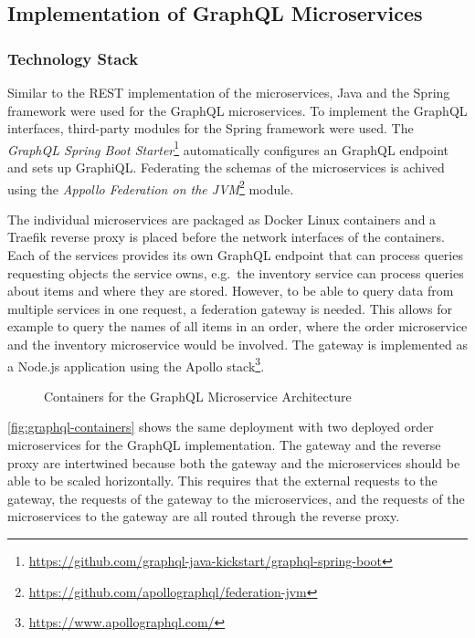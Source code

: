 \subsection{Implementation of GraphQL Microservices}

\subsubsection{Technology Stack}

Similar to the \ac{REST} implementation of the microservices, Java and the Spring framework were used for the GraphQL microservices.
To implement the GraphQL interfaces, third-party modules for the Spring framework were used.
The \textit{GraphQL Spring Boot Starter}\footnote{\url{https://github.com/graphql-java-kickstart/graphql-spring-boot}} automatically configures an GraphQL endpoint and sets up GraphiQL.%
Federating the schemas of the microservices is achived using the \textit{Appollo Federation on the \acs{JVM}}\footnote{\url{https://github.com/apollographql/federation-jvm}} module.

The individual microservices are packaged as Docker Linux containers and a Traefik reverse proxy is placed before the network interfaces of the containers.
Each of the services provides its own GraphQL endpoint that can process queries requesting objects the service owns, e.g.~the inventory service can process queries about items and where they are stored.
However, to be able to query data from multiple services in one request, a federation gateway is needed.
This allows for example to query the names of all items in an order, where the order microservice and the inventory microservice would be involved.
The gateway is implemented as a Node.js application using the Apollo stack\footnote{\url{https://www.apollographql.com/}}.

\begin{figure}[!htb]
    \centering
    
    \caption{Containers for the GraphQL Microservice Architecture}\label{fig:graphql-containers}
\end{figure}

\autoref{fig:graphql-containers} shows the same deployment with two deployed order microservices for the GraphQL implementation.
The gateway and the reverse proxy are intertwined because both the gateway and the microservices should be able to be scaled horizontally.
This requires that the external requests to the gateway, the requests of the gateway to the microservices, and the requests of the microservices to the gateway are all routed through the reverse proxy.

